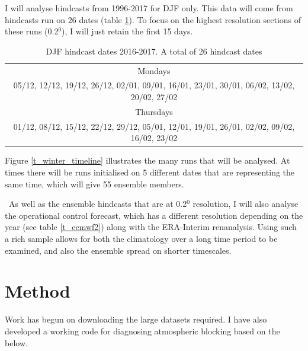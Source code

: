 
I will analyse hindcasts from 1996-2017 for DJF only. This data will come from hindcasts run on 26 dates (table \ref{t_winterdates}). To focus on the highest resolution sections of these runs (0.2$^0$), I will just retain the first 15 days.

\begin{table}[h]
	\caption{DJF hindcast dates 2016-2017. A total of 26 hindcast dates}\label{t_winterdates}
	\begin{center}
		\begin{tabular}{c}
			\hline\hline
			Mondays \\
			05/12, 12/12, 19/12, 26/12, 02/01, 09/01, 16/01, 23/01, 30/01, 06/02, 13/02, 20/02, 27/02 \\ 
			\hline
			Thursdays \\			
			01/12, 08/12, 15/12, 22/12, 29/12, 05/01, 12/01, 19/01, 26/01, 02/02, 09/02, 16/02, 23/02  \\ 			
			\hline
		\end{tabular}
	\end{center}
\end{table}

Figure \ref{t_winter_timeline} illustrates the many runs that will be analysed. At times there will be runs initialised on 5 different dates that are representing the same time, which will give 55 ensemble members.

\
As well as the ensemble hindcasts that are at 0.2$^0$ resolution, I will also analyse the operational control forecast, which has a different resolution depending on the year (see table \ref{t_ecmwf2}) along with the ERA-Interim renanalysis.
Using such a rich sample allows for both the climatology over a long time period to be examined, and also 
the ensemble spread on shorter timescales.


\section{Method}
Work has begun on downloading the large datasets required. I have also developed a working code for diagnosing atmospheric blocking based on the below.


